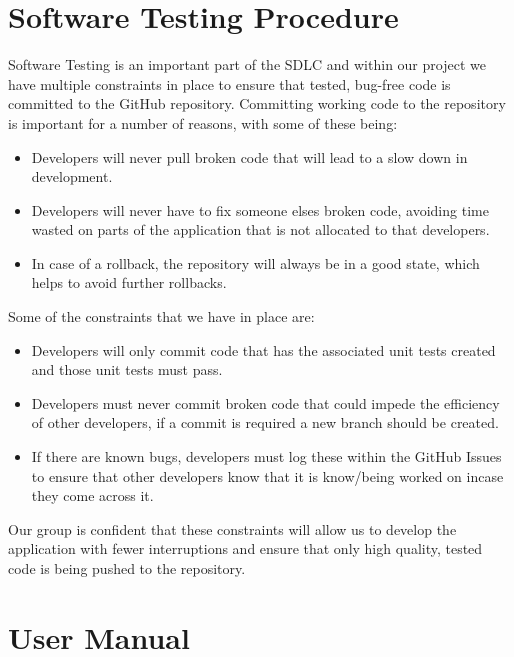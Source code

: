 \documentclass[
  english,
  a4paper,
,tablecaptionabove
]{scrartcl}
\providecommand{\tightlist}{%
  \setlength{\itemsep}{0pt}\setlength{\parskip}{0pt}}
\begin{document}
\newpage

\hypertarget{software-testing-procedure}{%
\section{Software Testing Procedure}\label{software-testing-procedure}}

Software Testing is an important part of the SDLC and within our project
we have multiple constraints in place to ensure that tested, bug-free
code is committed to the GitHub repository. Committing working code to
the repository is important for a number of reasons, with some of these
being:

\begin{itemize}
\tightlist
\item
  Developers will never pull broken code that will lead to a slow down
  in development.
\item
  Developers will never have to fix someone elses broken code, avoiding
  time wasted on parts of the application that is not allocated to that
  developers.
\item
  In case of a rollback, the repository will always be in a good state,
  which helps to avoid further rollbacks.
\end{itemize}

Some of the constraints that we have in place are:

\begin{itemize}
\tightlist
\item
  Developers will only commit code that has the associated unit tests
  created and those unit tests must pass.
\item
  Developers must never commit broken code that could impede the
  efficiency of other developers, if a commit is required a new branch
  should be created.
\item
  If there are known bugs, developers must log these within the GitHub
  Issues to ensure that other developers know that it is know/being
  worked on incase they come across it.
\end{itemize}

Our group is confident that these constraints will allow us to develop
the application with fewer interruptions and ensure that only high
quality, tested code is being pushed to the repository.

\newpage

\hypertarget{user-manual}{%
\section{User Manual}\label{user-manual}}
\end{document}
